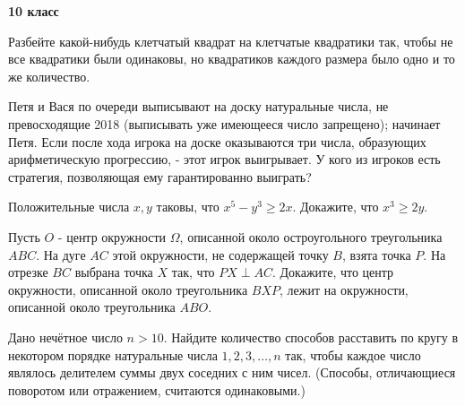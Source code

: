 \centerline{\bf \Huge 10 класс}

Разбейте какой-нибудь клетчатый квадрат на клетчатые квадратики так, чтобы не все квадратики были одинаковы, но квадратиков каждого размера было одно и то же количество.

Петя и Вася по очереди выписывают на доску натуральные числа, не превосходящие 2018 (выписывать уже имеющееся число запрещено); начинает Петя. Если после хода игрока на доске оказываются три числа, образующих арифметическую прогрессию, - этот игрок выигрывает. У кого из игроков есть стратегия, позволяющая ему гарантированно выиграть?

Положительные числа $x, y$ таковы, что $x^5-y^3 \geqslant 2 x$. Докажите, что $x^3 \geqslant 2 y$.

Пусть $O$ - центр окружности $\Omega$, описанной около остроугольного треугольника $A B C$. На дуге $A C$ этой окружности, не содержащей точку $B$, взята точка $P$. На отрезке $B C$ выбрана точка $X$ так, что $P X \perp A C$. Докажите, что центр окружности, описанной около треугольника $B X P$, лежит на окружности, описанной около треугольника $A B O$.
    
Дано нечётное число $n>10$. Найдите количество способов расставить по кругу в некотором порядке натуральные числа $1,2,3, \ldots, n$ так, чтобы каждое число являлось делителем суммы двух соседних с ним чисел. (Способы, отличающиеся поворотом или отражением, считаются одинаковыми.)